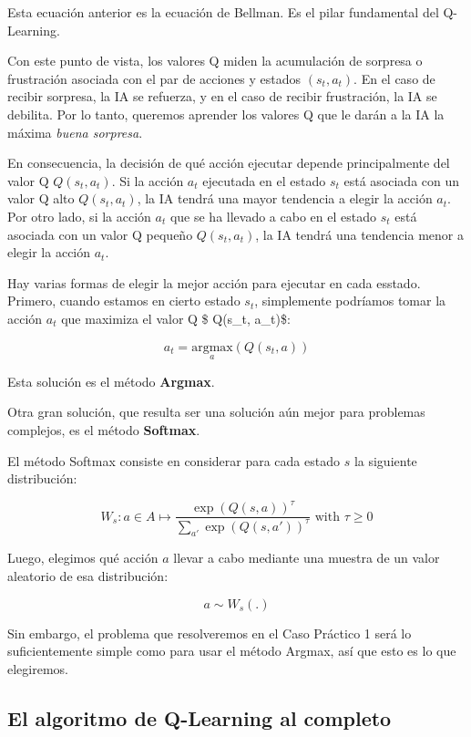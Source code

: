 \documentclass[
]{book}
\begin{document}
Esta ecuación anterior es la ecuación de Bellman. Es el pilar fundamental del Q-Learning.

Con este punto de vista, los valores Q miden la acumulación de sorpresa o frustración asociada con el par de acciones y estados \((s_t, a_t)\). En el caso de recibir sorpresa, la IA se refuerza, y en el caso de recibir frustración, la IA se debilita. Por lo tanto, queremos aprender los valores Q que le darán a la IA la máxima \emph{buena sorpresa}.

En consecuencia, la decisión de qué acción ejecutar depende principalmente del valor Q \(Q(s_t, a_t)\). Si la acción \(a_t\) ejecutada en el estado \(s_t\) está asociada con un valor Q alto \(Q (s_t, a_t)\), la IA tendrá una mayor tendencia a elegir la acción \(a_t\). Por otro lado, si la acción \(a_t\) que se ha llevado a cabo en el estado \(s_t\) está asociada con un valor Q pequeño \(Q(s_t, a_t)\), la IA tendrá una tendencia menor a elegir la acción \(a_t\).

Hay varias formas de elegir la mejor acción para ejecutar en cada esstado. Primero, cuando estamos en cierto estado \(s_t\), simplemente podríamos tomar la acción \(a_t\) que maximiza el valor Q \$ Q(s\_t, a\_t)\$:

\[a_t = \underset{a}{\textrm{argmax}}(Q(s_t,a))\]

Esta solución es el método \textbf{Argmax}.

Otra gran solución, que resulta ser una solución aún mejor para problemas complejos, es el método \textbf{Softmax}.

El método Softmax consiste en considerar para cada estado \(s\) la siguiente distribución:

\[W_s: a \in A \mapsto \frac{\exp(Q(s,a))^{\tau}}{\sum_{a'}\exp(Q(s,a'))^{\tau}} \textrm{ with } \tau \ge 0\]

Luego, elegimos qué acción \(a\) llevar a cabo mediante una muestra de un valor aleatorio de esa distribución:

\[a \sim W_s(.)\]

Sin embargo, el problema que resolveremos en el Caso Práctico 1 será lo suficientemente simple como para usar el método Argmax, así que esto es lo que elegiremos.

\hypertarget{el-algoritmo-de-q-learning-al-completo}{%
\subsection{El algoritmo de Q-Learning al completo}\label{el-algoritmo-de-q-learning-al-completo}}
\end{document}
